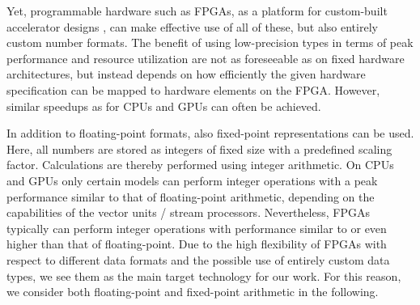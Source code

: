 Yet, programmable hardware such as FPGAs, as a platform for custom-built accelerator designs \cite{KenterVector, KenterPragma}, can make effective use of all of these, but also entirely custom number formats. The benefit of using low-precision types in terms of peak performance and resource utilization are not as foreseeable as on fixed hardware architectures, but instead depends on how efficiently the given hardware specification can be mapped to hardware elements on the FPGA. However, similar speedups as for CPUs and GPUs can often be achieved.

In addition to floating-point formats, also fixed-point representations can be used. Here, all numbers are stored as integers of fixed size with a
predefined scaling factor. Calculations are thereby performed using integer arithmetic. On CPUs and GPUs only certain models can perform integer operations with a peak performance similar to that of floating-point arithmetic, depending on the capabilities of the vector units / stream processors. Nevertheless, FPGAs typically can perform integer operations with performance similar to or even higher than that of floating-point. Due to the high flexibility of FPGAs with respect to different data formats and the possible use of entirely custom data types, we see them as the main target technology for our work. For this reason, we consider both floating-point and fixed-point arithmetic in the following.
